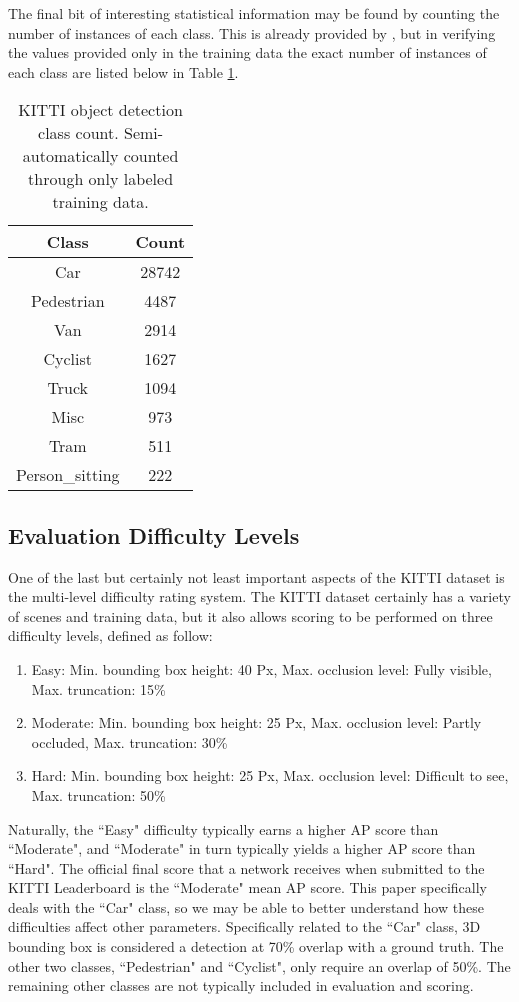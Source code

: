 The final bit of interesting statistical information may be found by counting the number of instances of each class. This is already provided by \cite{geiger_are_2012}, but in verifying the values provided only in the training data the exact number of instances of each class are listed below in Table \ref{kitti_class_stats}. 

\begin{table}[h]
	\centering
	\caption{KITTI object detection class count. Semi-automatically counted through only labeled training data.}
	\begin{tabular}{|c|c|}
		\hline
		\bfseries Class & \bfseries Count\\
		\hline
		Car & 28742 \\
		\hline
		Pedestrian & 4487 \\
		\hline
		Van & 2914 \\
		\hline
		Cyclist & 1627 \\
		\hline
		Truck & 1094 \\
		\hline
		Misc & 973 \\
		\hline
		Tram & 511 \\
		\hline
		Person\_sitting & 222 \\
		\hline
	\end{tabular}
	\label{kitti_class_stats}
\end{table}

\subsection{Evaluation Difficulty Levels}
One of the last but certainly not least important aspects of the KITTI dataset is the multi-level difficulty rating system. The KITTI dataset certainly has a variety of scenes and training data, but it also allows scoring to be performed on three difficulty levels, defined as follow: 

\begin{enumerate}\itemsep=-0.5em
	\item Easy: Min. bounding box height: 40 Px, Max. occlusion level: Fully visible, Max. truncation: 15\%
	\item Moderate: Min. bounding box height: 25 Px, Max. occlusion level: Partly occluded, Max. truncation: 30\%
	\item Hard: Min. bounding box height: 25 Px, Max. occlusion level: Difficult to see, Max. truncation: 50\%
\end{enumerate}

Naturally, the ``Easy" difficulty typically earns a higher AP score than ``Moderate", and ``Moderate" in turn typically yields a higher AP score than ``Hard". The official final score that a network receives when submitted to the KITTI Leaderboard is the ``Moderate" mean AP score. This paper specifically deals with the ``Car" class, so we may be able to better understand how these difficulties affect other parameters. Specifically related to the ``Car" class, 3D bounding box is considered a detection at 70\% overlap with a ground truth. The other two classes, ``Pedestrian" and ``Cyclist", only require an overlap of 50\%. The remaining other classes are not typically included in evaluation and scoring. 

